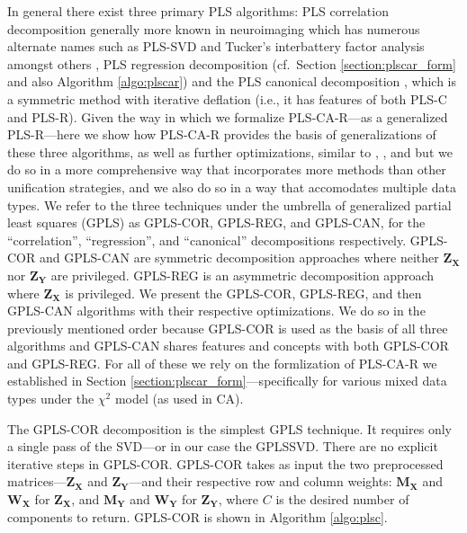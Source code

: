 \documentclass[12pt]{article}
\begin{document}
In general there exist three primary PLS algorithms: PLS correlation
decomposition \citep{bookstein1994partial, ketterlinus1989partial}
generally more known in neuroimaging
\citep{mcintosh_spatial_1996, mcintosh_partial_2004, krishnan_partial_2011}
which has numerous alternate names such as PLS-SVD and Tucker's
interbattery factor analysis \citep{tucker_inter-battery_1958} amongst
others \citep[see also][]{beaton_partial_2016}, PLS regression
decomposition (cf.~Section \ref{section:plscar_form} and also Algorithm
\ref{algo:plscar}) and the PLS canonical decomposition
\citep{tenenhaus_regression_1998, wegelin2000survey}, which is a
symmetric method with iterative deflation (i.e., it has features of both
PLS-C and PLS-R). Given the way in which we formalize PLS-CA-R---as a
generalized PLS-R---here we show how PLS-CA-R provides the basis of
generalizations of these three algorithms, as well as further
optimizations, similar to \citet{borga_unified_1992},
\citet{indahl2009canonical}, and \citet{de2019pls} but we do so in a
more comprehensive way that incorporates more methods than other
unification strategies, and we also do so in a way that accomodates
multiple data types. We refer to the three techniques under the umbrella
of generalized partial least squares (GPLS) as GPLS-COR, GPLS-REG, and
GPLS-CAN, for the ``correlation'', ``regression'', and ``canonical''
decompositions respectively. GPLS-COR and GPLS-CAN are symmetric
decomposition approaches where neither \({\mathbf Z}_{{\mathbf X}}\) nor
\({\mathbf Z}_{{\mathbf Y}}\) are privileged. GPLS-REG is an asymmetric
decomposition approach where \({\mathbf Z}_{{\mathbf X}}\) is
privileged. We present the GPLS-COR, GPLS-REG, and then GPLS-CAN
algorithms with their respective optimizations. We do so in the
previously mentioned order because GPLS-COR is used as the basis of all
three algorithms and GPLS-CAN shares features and concepts with both
GPLS-COR and GPLS-REG. For all of these we rely on the formlization of
PLS-CA-R we established in Section
\ref{section:plscar_form}---specifically for various mixed data types
under the \(\chi^2\) model (as used in CA).

The GPLS-COR decomposition is the simplest GPLS technique. It requires
only a single pass of the SVD---or in our case the GPLSSVD. There are no
explicit iterative steps in GPLS-COR. GPLS-COR takes as input the two
preprocessed matrices---\({\mathbf Z}_{\mathbf X}\) and
\({\mathbf Z}_{\mathbf Y}\)---and their respective row and column
weights: \({\mathbf M}_{\mathbf X}\) and \({\mathbf W}_{\mathbf X}\) for
\({\mathbf Z}_{\mathbf X}\), and \({\mathbf M}_{\mathbf Y}\) and
\({\mathbf W}_{\mathbf Y}\) for \({\mathbf Z}_{\mathbf Y}\), where \(C\)
is the desired number of components to return. GPLS-COR is shown in
Algorithm \ref{algo:plsc}.
\end{document}
